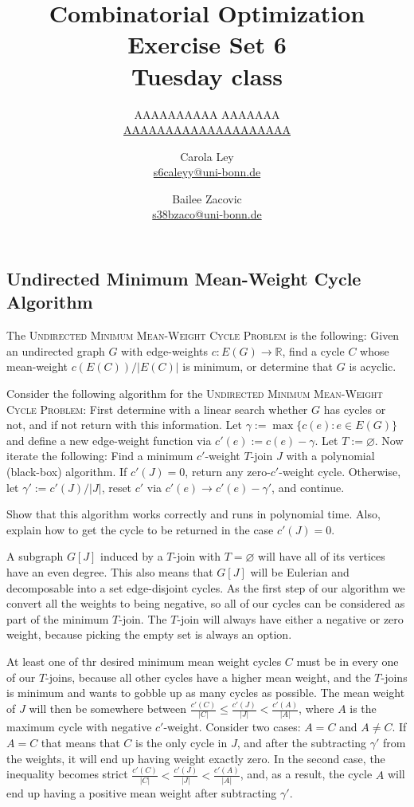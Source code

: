 \documentclass{article}
\title{Combinatorial Optimization \\ Exercise Set 6 \\ Tuesday class}
\author{
  AAAAAAAAAA AAAAAAA \\
  \href{mailto:AAAAAAAAAAAAAAAAAAAA}{AAAAAAAAAAAAAAAAAAAA}
  \and
  Carola Ley \\
  \href{mailto:s6caleyy@uni-bonn.de}{s6caleyy@uni-bonn.de}
  \and
  Bailee Zacovic \\
  \href{mailto:s38bzaco@uni-bonn.de}{s38bzaco@uni-bonn.de}
}
\let\emptyset\varnothing
\newcommand{\R}{\mathbb{R}}
\begin{document}
  \maketitle

  \setcounter{section}{6}
  \subsection{Undirected Minimum Mean-Weight Cycle Algorithm}
  \begin{centerframebox}
    The \textsc{Undirected Minimum Mean-Weight Cycle Problem}
    is the following: Given an undirected graph $G$ with edge-weights $c : E(G) \to \R$,
    find a cycle $C$ whose mean-weight $c(E(C))/|E(C)|$ is minimum, or determine that
    $G$ is acyclic.

    Consider the following algorithm for the \textsc{Undirected Minimum Mean-Weight Cycle Problem}:
    First determine with a linear search whether $G$ has cycles or not, and if not return with this information.
    Let $\gamma := \max\{c(e) : e \in E(G)\}$ and define a new edge-weight function via $c'(e) := c(e) - \gamma$.
    Let $T := \emptyset$.
    Now iterate the following: Find a minimum $c'$-weight $T$-join $J$ with a polynomial (black-box) algorithm.
    If $c'(J) = 0$, return any zero-$c'$-weight cycle.
    Otherwise, let $\gamma':= c'(J)/|J|$, reset $c'$ via $c'(e) \rightarrow c'(e) - \gamma'$, and continue.

    Show that this algorithm works correctly and runs in polynomial time.
    Also, explain how to get the cycle to be returned in the case $c'(J) = 0$.
  \end{centerframebox}
  A subgraph $G[J]$ induced by a $T$-join with $T = \emptyset$ will have all of its vertices have an even degree.
  This also means that $G[J]$ will be Eulerian and decomposable into a set edge-disjoint cycles.
  As the first step of our algorithm we convert all the weights to being negative,
  so all of our cycles can be considered as part of the minimum $T$-join.
  The $T$-join will always have either a negative or zero weight, because picking the empty set is always an option.

  At least one of thr desired minimum mean weight cycles $C$ must be in every one of our $T$-joins,
  because all other cycles have a higher mean weight, and the $T$-joins is minimum and wants to gobble up as many cycles as possible.
  The mean weight of $J$ will then be somewhere between $\frac{c'(C)}{|C|} \leq \frac{c'(J)}{|J|} < \frac{c'(A)}{|A|}$,
  where $A$ is the maximum cycle with negative $c'$-weight.
  Consider two cases: $A = C$ and $A \neq C$. If $A = C$ that means that $C$ is the only cycle in $J$,
  and after the subtracting $\gamma'$ from the weights, it will end up having weight exactly zero.
  In the second case, the inequality becomes strict $\frac{c'(C)}{|C|} < \frac{c'(J)}{|J|} < \frac{c'(A)}{|A|}$,
  and, as a result, the cycle $A$ will end up having a positive mean weight after subtracting $\gamma'$.
\end{document}

